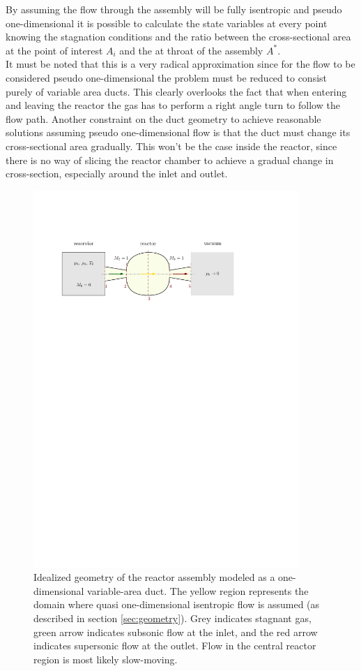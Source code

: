 	By assuming the flow through the assembly will be fully isentropic and pseudo one-dimensional it is possible to calculate the state variables at every point knowing the stagnation conditions and the ratio between the cross-sectional area at the point of interest $A_i$ and the at throat of the assembly $A^*$.\\
	It must be noted that this is a very radical approximation since for the flow to be  considered pseudo one-dimensional the problem must be reduced to consist purely of variable area ducts.
	This clearly overlooks the fact that when entering and leaving the reactor the gas has to perform a right angle turn to follow the flow path.
	Another constraint on the duct geometry to achieve reasonable solutions assuming pseudo one-dimensional flow is that the duct must change its cross-sectional area gradually.
	\cite{anderson2021modern}
	This won't be the case inside the reactor, since there is no way of slicing the reactor chamber to achieve a gradual change in cross-section, especially around the inlet and outlet.
	\begin{figure}[H]
	    \centering
	    \includegraphics[width=0.9\textwidth]{src/03_analytical-work/fig_1d-flow-geometry}
	    \caption{Idealized geometry of the reactor assembly modeled as a one-dimensional variable-area duct. The yellow region represents the domain where quasi one-dimensional isentropic flow is assumed (as described in section \ref{sec:geometry}). Grey indicates stagnant gas, green arrow indicates subsonic flow at the inlet, and the red arrow indicates supersonic flow at the outlet. Flow in the central reactor region is most likely slow-moving.}
	\end{figure}
